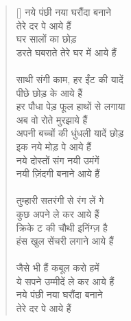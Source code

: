 \begin{verse}[\versewidth]\texthindi{
नये पंछी नया घरौंदा बनाने\\
तेरे दर पे आये हैं\\
घर सालों का छोड़\\
डरते घबराते तेरे घर में आये हैं\\
\\
साथी संगी काम, हर ईंट की यादें\\
पीछे छोड़ के आये हैं\\
हर पौधा पेड़ फूल हाथों से लगाया\\
अब वो रोते मुरझाये हैं\\
अपनी बच्चों की धुंधली यादें छोड़\\
इक नये मोड़ पे आये हैं\\
नये दोस्तों संग नयी उमंगें\\
नयी ज़िंदगी बनाने आये हैं\\
\\
तुम्हारी सतरंगी से रंग लें गे\\
कुछ अपने ले कर आये हैं\\
क्रिके ट की चौथी इनिंग्ज़ है\\
हंस खुल सेंचरी लगाने आये हैं\\
\\
जैसे भी हैं कबूल करो हमें\\
ये सपने उम्मीदें ले कर आये हैं\\
नये पंछी नया घरौंदा बनाने\\
तेरे दर पे आये हैं
}\end{verse}

